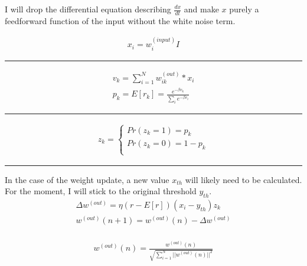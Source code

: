 \documentclass[11pt]{article}
\begin{document}
I will drop the differential equation describing \(\frac{dx}{dt}\) and
make \(x\) purely a feedforward function of the input without the white
noise term.

\begin{align}
x_i = w_i^{(input)}I
\end{align}

\begin{center}\rule{0.5\linewidth}{\linethickness}\end{center}

\begin{align}
v_k = \sum_{i=1}^N w_{ik}^{(out)} * x_i \\
p_k = E[r_k] = \frac{e^{-\beta v_k}}{\sum_i e^{-\beta v_i}}
\end{align}

\begin{center}\rule{0.5\linewidth}{\linethickness}\end{center}

\begin{align}
z_k=   \left\{
\begin{array}{ll}
      Pr(z_k=1) = p_k   \\
      Pr(z_k=0) = 1-p_k  \\
\end{array} 
\right.
\end{align}

\begin{center}\rule{0.5\linewidth}{\linethickness}\end{center}

In the case of the weight update, a new value \(x_{th}\) will likely
need to be calculated. For the moment, I will stick to the original
threshold \(y_{th}\). \begin{align}
\Delta w^{(out)} = \eta (r - E[r]) (x_i - y_{th}) z_k \\
w^{(out)}(n + 1) = w^{(out)}(n) - \Delta w^{(out)} \\
\end{align}

\begin{align}
w^{(out)}(n) = \frac{w^{(out)}(n)}{\sqrt{\sum_{i=1}^N ||w^{(out)}(n)||^2}}
\end{align}
\end{document}
